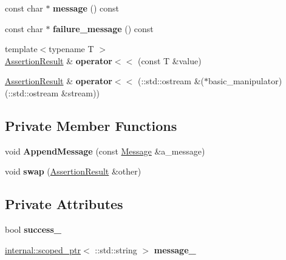 \begin{DoxyCompactItemize}
const char $\ast$ {\bfseries message} () const
\item 
\mbox{\label{classtesting_1_1_assertion_result_aa38908d5a48c912434a80c8725f52583}} 
const char $\ast$ {\bfseries failure\+\_\+message} () const
\item 
\mbox{\label{classtesting_1_1_assertion_result_a3230efa81aafe7c61f5fb878cfa39e91}} 
{\footnotesize template$<$typename T $>$ }\\\hyperlink{classtesting_1_1_assertion_result}{Assertion\+Result} \& {\bfseries operator$<$$<$} (const T \&value)
\item 
\mbox{\label{classtesting_1_1_assertion_result_a43ae8a260843ce2ff3dc9af262672b8b}} 
\hyperlink{classtesting_1_1_assertion_result}{Assertion\+Result} \& {\bfseries operator$<$$<$} (\+::std\+::ostream \&($\ast$basic\+\_\+manipulator)(\+::std\+::ostream \&stream))
\end{DoxyCompactItemize}
\subsection*{Private Member Functions}
\begin{DoxyCompactItemize}
\item 
\mbox{\label{classtesting_1_1_assertion_result_a5b55e01f1321d744a594dbe51d46a139}} 
void {\bfseries Append\+Message} (const \hyperlink{classtesting_1_1_message}{Message} \&a\+\_\+message)
\item 
\mbox{\label{classtesting_1_1_assertion_result_ab5b92c1be40f9ce9d7c3e0cf7bf65c61}} 
void {\bfseries swap} (\hyperlink{classtesting_1_1_assertion_result}{Assertion\+Result} \&other)
\end{DoxyCompactItemize}
\subsection*{Private Attributes}
\begin{DoxyCompactItemize}
\item 
\mbox{\label{classtesting_1_1_assertion_result_ae7348f9fffe7a20980dfc94fc261d7ca}} 
bool {\bfseries success\+\_\+}
\item 
\mbox{\label{classtesting_1_1_assertion_result_a5dee995939457def35f0bf496d070957}} 
\hyperlink{classtesting_1_1internal_1_1scoped__ptr}{internal\+::scoped\+\_\+ptr}$<$ \+::std\+::string $>$ {\bfseries message\+\_\+}
\end{DoxyCompactItemize}


